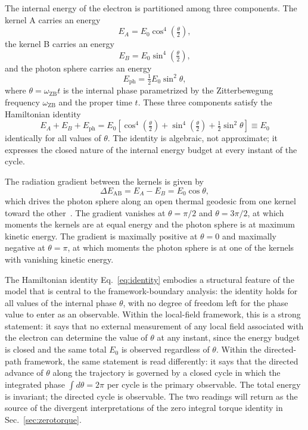 \documentclass[%
 reprint, amsmath,amssymb, aps, prb, ]{revtex4-2}
\numberwithin{equation}{section}
\newcommand{\omZB}{\omega_{\text{ZB}}}
\newcommand{\EphS}{E_{\text{ph}}}
\newcommand{\Egrad}{\Delta E_{\text{AB}}}
\begin{document}
The internal energy of the electron is partitioned among three components. The kernel A carries an energy
\begin{equation}
E_A = E_0\cos^4\!\!\left(\tfrac{\theta}{2}\right),
\label{eq:EA_56}
\end{equation}
the kernel B carries an energy
\begin{equation}
E_B = E_0\sin^4\!\!\left(\tfrac{\theta}{2}\right),
\label{eq:EB_56}
\end{equation}
and the photon sphere carries an energy
\begin{equation}
\EphS = \tfrac{1}{2}E_0\sin^2\theta,
\label{eq:Eph_56}
\end{equation}
where $\theta = \omZB t$ is the internal phase parametrized by the Zitterbewegung frequency $\omZB$ and the proper time $t$. These three components satisfy the Hamiltonian identity
\begin{equation}
E_A + E_B + \EphS = E_0\!\left[\cos^4\!\!\left(\tfrac{\theta}{2}\right) + \sin^4\!\!\left(\tfrac{\theta}{2}\right) + \tfrac{1}{2}\sin^2\theta\right] \equiv E_0
\label{eq:identity}
\end{equation}
identically for all values of $\theta$. The identity is algebraic, not approximate; it expresses the closed nature of the internal energy budget at every instant of the cycle.

The radiation gradient between the kernels is given by
\begin{equation}
\Egrad = E_A - E_B = E_0\cos\theta,
\label{eq:gradient}
\end{equation}
which drives the photon sphere along an open thermal geodesic from one kernel toward the other~\cite{hanamura24}. The gradient vanishes at $\theta = \pi/2$ and $\theta = 3\pi/2$, at which moments the kernels are at equal energy and the photon sphere is at maximum kinetic energy. The gradient is maximally positive at $\theta = 0$ and maximally negative at $\theta = \pi$, at which moments the photon sphere is at one of the kernels with vanishing kinetic energy.

The Hamiltonian identity Eq.~\eqref{eq:identity} embodies a structural feature of the model that is central to the framework-boundary analysis: the identity holds for all values of the internal phase $\theta$, with no degree of freedom left for the phase value to enter as an observable. Within the local-field framework, this is a strong statement: it says that no external measurement of any local field associated with the electron can determine the value of $\theta$ at any instant, since the energy budget is closed and the same total $E_0$ is observed regardless of $\theta$. Within the directed-path framework, the same statement is read differently: it says that the directed advance of $\theta$ along the trajectory is governed by a closed cycle in which the integrated phase $\int d\theta = 2\pi$ per cycle is the primary observable. The total energy is invariant; the directed cycle is observable. The two readings will return as the source of the divergent interpretations of the zero integral torque identity in Sec.~\ref{sec:zerotorque}.
\end{document}
